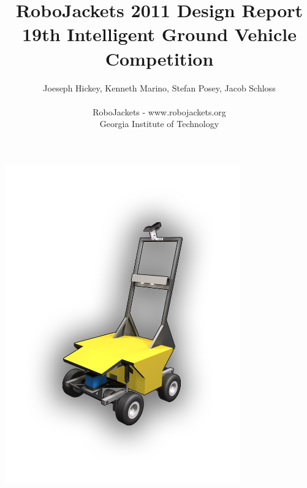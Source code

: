 \documentclass[letterpaper,12pt]{article}
\title{RoboJackets 2011 Design Report\\\large{19th Intelligent Ground Vehicle Competition}}
\author{
Joeseph Hickey, Kenneth Marino, Stefan Posey, Jacob Schloss
\\
\\
RoboJackets - www.robojackets.org
\\
Georgia Institute of Technology
}
\date{}
\begin{document}
\maketitle
\thispagestyle{empty}
\begin{center}
\includegraphics[width=4in]{./pics/RobotFrontCover.png}
\end{center}

%

\newpage
\setcounter{tocdepth}{2}
\tableofcontents

\newpage
\listoffigures
\listoftables

\newpage


%









%
\end{document}
